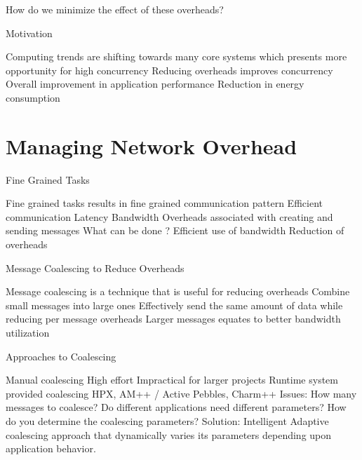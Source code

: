 \documentclass[10pt]{beamer}
\begin{document}
\begin{frame}{}
\alert{How do we minimize the effect of these overheads?}
\end{frame}

\begin{frame}{Motivation}
\begin{outline}
	\1 Computing trends are shifting towards many core systems which presents more opportunity for high concurrency
	\1 Reducing overheads improves concurrency 
	\1 Overall improvement in application performance
	\1 Reduction in energy consumption
\end{outline}
\end{frame}
%

\section{Managing Network Overhead}

\begin{frame}{Fine Grained Tasks}
\begin{outline}
	\1 Fine grained tasks results in fine grained communication pattern 
	\1 Efficient communication 
		\2 Latency
		\2 Bandwidth
		\2 Overheads associated with creating and sending messages
	\1 What can be done ?
		\2 Efficient use of bandwidth
		\2 \alert{Reduction of overheads}
\end{outline}	
\end{frame}

\begin{frame}{Message Coalescing to Reduce Overheads}
\begin{outline}
	\1 \alert{Message coalescing} is a technique that is useful for reducing overheads
	\1 Combine small messages into large ones
	\1 Effectively send the same amount of data while reducing per message overheads
	\1 Larger messages equates to better bandwidth utilization
\end{outline}
\end{frame}

\begin{frame}{Approaches to Coalescing}
\begin{outline}
	\1 Manual coalescing
		\2 High effort
		\2 Impractical for larger projects
	\1 Runtime system provided coalescing
		\2 HPX, AM++ / Active Pebbles, Charm++
	\1 Issues: 
		\2 How many messages to coalesce?	
		\2 Do different applications need different parameters?
		\2 How do you determine the coalescing parameters?
	\1 Solution: \alert{Intelligent Adaptive coalescing approach that dynamically varies its parameters depending upon application behavior.} 
\end{outline}
\end{frame}
\end{document}
